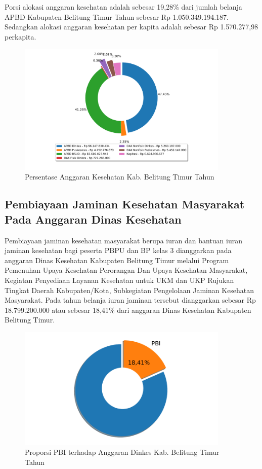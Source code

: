 Porsi alokasi anggaran kesehatan adalah sebesar 19,28\% dari jumlah belanja APBD Kabupaten Belitung Timur Tahun \tP sebesar Rp 1.050.349.194.187. Sedangkan alokasi anggaran kesehatan per kapita adalah sebesar Rp 1.570.277,98 perkapita.

\begin{figure}[htb]
    \centering{}
    \includegraphics[width=0.9\textwidth]{bab_04/bab_04_03_anggaranKesehatan}
    \caption{Persentase Anggaran Kesehatan Kab. Belitung Timur Tahun \tP}
    \label{fig:Anggaran-Kesehatan}
\end{figure}

\subsection{Pembiayaan Jaminan Kesehatan Masyarakat Pada Anggaran Dinas Kesehatan}
Pembiayaan jaminan kesehatan masyarakat berupa iuran dan bantuan iuran jaminan kesehatan bagi peserta PBPU dan BP kelas 3 dianggarkan pada anggaran Dinas Kesehatan Kabupaten Belitung Timur melalui Program Pemenuhan Upaya Kesehatan Perorangan Dan Upaya Kesehatan Masyarakat, Kegiatan Penyediaan Layanan Kesehatan untuk UKM dan UKP Rujukan Tingkat Daerah Kabupaten/Kota, Subkegiatan Pengelolaan Jaminan Kesehatan Masyarakat. Pada tahun \tP belanja iuran jaminan tersebut dianggarkan sebesar Rp 18.799.200.000 atau sebesar 18,41\% dari anggaran Dinas Kesehatan Kabupaten Belitung Timur.

\begin{figure}[htb]
	\centering{}
	\includegraphics[width=0.9\textwidth]{bab_04/bab_04_04_proporsiPBI}
	\caption{Proporsi PBI terhadap Anggaran Dinkes Kab. Belitung Timur Tahun \tP}
	\label{fig:Proporsi-PBI}
\end{figure}

